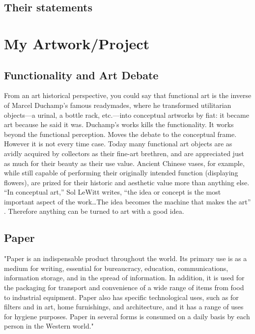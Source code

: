 \documentclass[12pt]{article}
\providecommand{\quotes}[1]{``#1''}
\begin{document}
\subsection{Their statements}

\section{My Artwork/Project}

\subsection{Functionality and Art Debate}
From an art historical perspective, you could say that functional art is the inverse of Marcel Duchamp's famous readymades, where he transformed utilitarian objects---a urinal, a bottle rack, etc.---into conceptual artworks by fiat: it became art because he said it was. Duchamp's works kills the functionality. It works beyond the functional perception. Moves the debate to the conceptual frame. However it is not every time case. Today many functional art objects are as avidly acquired by collectors as their fine-art brethren, and are appreciated just as much for their beauty as their use value. Ancient Chinese vases, for example, while still capable of performing their originally intended function (displaying flowers), are prized for their historic and aesthetic value more than anything else. \quotes{In conceptual art,} Sol LeWitt writes, \quotes{the idea or concept is the most important aspect of the work\ldots The idea becomes the machine that makes the art} \cite{lewitt1967paragraphs}. Therefore anything can be turned to art with a good idea. 

\subsection{Paper}
"Paper is an indispensable product throughout the world. Its primary use is as a medium for writing, essential for bureaucracy, education, communications, information storage, and in the spread of information. In addition, it is used for the packaging for transport and convenience of a wide range of items from food to industrial equipment. Paper also has specific technological uses, such as for filters and in art, home furnishings, and architecture, and it has a range of uses for hygiene purposes. Paper in several forms is consumed on a daily basis by each person in the Western world." \cite{trafford2012paper}
\end{document}
